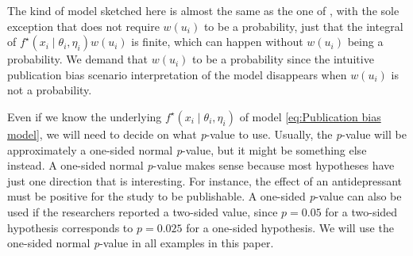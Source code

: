 \documentclass[useAMS,usenatbib,referee]{biom}
\begin{document}
The kind of model sketched here is almost the same as the one of \citet{hedges1992modeling}, with the sole exception that \citet{hedges1992modeling} does not require $w(u_i)$ to be a probability, just that the integral of $f^{\star}(x_{i}\mid\theta_{i},\eta_{i})w(u_i)$ is finite, which can happen without $w(u_i)$ being a probability. We demand that $w(u_i)$ to be a probability since the intuitive publication bias scenario interpretation of the model disappears when $w(u_i)$ is not a probability. %

Even if we know the underlying $f^{\star}(x_{i}\mid\theta_{i},\eta_{i})$ of model \eqref{eq:Publication bias model}, we will need to decide on what \textit{p}-value to use. Usually, the \textit{p}-value will be approximately a one-sided normal \textit{p}-value, but it might be something
else instead. A one-sided normal \textit{p}-value makes sense because most hypotheses have just one direction that is interesting. For instance, the effect of an antidepressant must be positive for the study to be publishable. A one-sided \textit{p}-value can also be used if the researchers reported a two-sided value, since $p=0.05$ for a two-sided hypothesis corresponds to $p=0.025$ for a one-sided hypothesis. We will use the one-sided normal \textit{p}-value in all examples in this paper.
\end{document}
